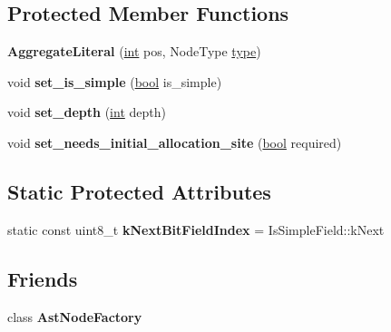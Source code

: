 \subsection*{Protected Member Functions}
\begin{DoxyCompactItemize}
\item 
\mbox{\label{classv8_1_1internal_1_1AggregateLiteral_a0da2aa8d2d4d2a529faaeaaea8ff133f}} 
{\bfseries Aggregate\+Literal} (\mbox{\hyperlink{classint}{int}} pos, Node\+Type \mbox{\hyperlink{classstd_1_1conditional_1_1type}{type}})
\item 
\mbox{\label{classv8_1_1internal_1_1AggregateLiteral_a66bba6b8a0d7de7daf638bff629e044e}} 
void {\bfseries set\+\_\+is\+\_\+simple} (\mbox{\hyperlink{classbool}{bool}} is\+\_\+simple)
\item 
\mbox{\label{classv8_1_1internal_1_1AggregateLiteral_a6afd47480bd72e259c1202f996a6a40b}} 
void {\bfseries set\+\_\+depth} (\mbox{\hyperlink{classint}{int}} depth)
\item 
\mbox{\label{classv8_1_1internal_1_1AggregateLiteral_a4940d433db71d83c337591d2ca9b92b8}} 
void {\bfseries set\+\_\+needs\+\_\+initial\+\_\+allocation\+\_\+site} (\mbox{\hyperlink{classbool}{bool}} required)
\end{DoxyCompactItemize}
\subsection*{Static Protected Attributes}
\begin{DoxyCompactItemize}
\item 
\mbox{\label{classv8_1_1internal_1_1AggregateLiteral_a986b62c8d0ff893b7522e8c29f436226}} 
static const uint8\+\_\+t {\bfseries k\+Next\+Bit\+Field\+Index} = Is\+Simple\+Field\+::k\+Next
\end{DoxyCompactItemize}
\subsection*{Friends}
\begin{DoxyCompactItemize}
\item 
\mbox{\label{classv8_1_1internal_1_1AggregateLiteral_a8d587c8ad3515ff6433eb83c578e795f}} 
class {\bfseries Ast\+Node\+Factory}
\end{DoxyCompactItemize}

